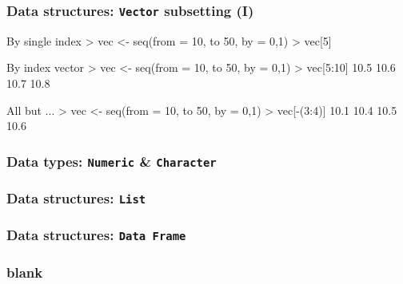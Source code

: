 \documentclass[ucs]{beamer}
\begin{document}
\begin{frame}
  \frametitle{Data structures: \texttt{Vector} subsetting (I)}

    \begin{block}{By single index}
      \ttfamily
     > vec <- seq(from = 10, to 50, by = 0,1)\newline
     > vec[5] \newline
     [1] 
    \end{block}
  
  \begin{block}{By index vector}  
   \ttfamily
  > vec <- seq(from = 10, to 50, by = 0,1)\newline
  > vec[5:10] 10.5 10.6 10.7 10.8
\end{block}

\begin{block}{All but ...}
   \ttfamily
> vec <- seq(from = 10, to 50, by = 0,1)\newline
> vec[-(3:4)]  10.1 10.4 10.5 10.6
\end{block}
  
\end{frame}

\begin{frame}
  \frametitle{Data types: \texttt{Numeric} \& \texttt{Character}}
     
\end{frame}


  \begin{frame}
    \frametitle{Data structures: \texttt{List}}
  \end{frame}
  
  \begin{frame}
    \frametitle{Data structures: \texttt{Data Frame}}
  \end{frame}


  
  \begin{frame}
    \frametitle{blank}
    \begin{columns}[T]
      \begin{column}{0.5\textwidth}
      \end{column}
     \begin{column}{0.5\textwidth}
      \end{column}
    \end{columns}
  \end{frame}
  
  
\end{document}
